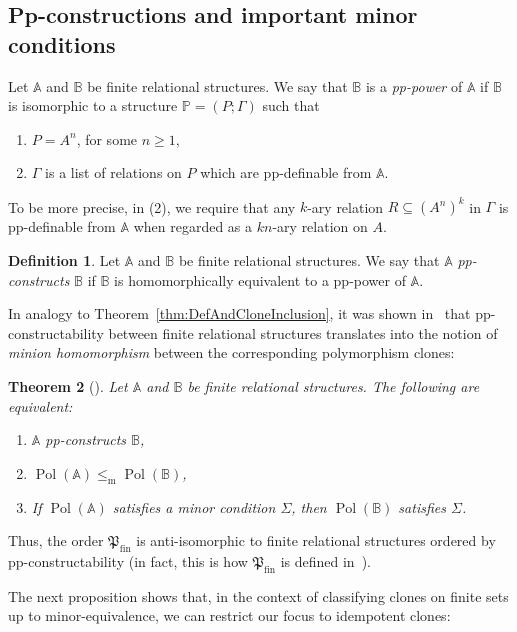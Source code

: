 \documentclass[12pt]{amsart}
\newtheorem{theorem}{Theorem}[section]
\theoremstyle{definition}
\theoremstyle{definition}
\newtheorem{definition}[theorem]{Definition}
\newcommand{\Pfin}{\mathfrak P_{\mathrm{fin}}}
\newcommand{\struct}[1]{\mathbb{#1}}
\DeclareMathOperator{\Pol}{Pol}
\newcommand{\isaminorof}{\leq_{\mathrm{m}}}
\begin{document}
\subsection{Pp-constructions and important minor conditions}
Let $\struct{A}$ and $\struct{B}$ be finite relational structures. We say that $\struct{B}$ is a \emph{pp-power} of $\struct{A}$ if $\struct{B}$ is isomorphic to a structure $\struct{P}=(P;\Gamma)$ such that
\begin{enumerate}
    \item $P=A^n$, for some $n\geq 1$,
    \item $\Gamma$ is a list of relations on $P$ which are pp-definable from $\struct{A}$.
\end{enumerate}
To be more precise, in (2), we require that any $k$-ary relation $R\subseteq (A^n)^k$ in $\Gamma$ is pp-definable from $\struct{A}$ when regarded as a $kn$-ary relation on $A$.

\begin{definition}
Let $\struct{A}$ and $\struct{B}$ be finite relational structures. We say that $\struct{A}$ \emph{pp-constructs} $\struct{B}$ if $\struct{B}$ is homomorphically equivalent to a pp-power of $\struct{A}$.
\end{definition}
In analogy to Theorem~\ref{thm:DefAndCloneInclusion}, it was shown in~\cite{wonderland} that pp-constructability between finite relational structures translates into the notion of \emph{minion homomorphism} between the corresponding polymorphism clones:

\begin{theorem}[\cite{wonderland}]\label{thm:minhomAndPPConAreTheSameThing} Let $\struct{A}$ and $\struct{B}$ be finite relational structures. The following are equivalent:
\begin{enumerate}
     \item $\struct{A}$ pp-constructs $\struct{B}$,
    \item $\Pol(\struct{A})\isaminorof\Pol(\struct{B})$,
    \item If $\Pol(\struct{A})$ satisfies a minor condition $\Sigma$, then $\Pol(\struct{B})$ satisfies $\Sigma$.
\end{enumerate}
\end{theorem}

Thus, the order $\Pfin$ is anti-isomorphic to finite relational structures ordered by pp-constructability (in fact, this is how $\Pfin$ is defined in~\cite{albert}).

The next proposition shows that, in the context of classifying clones on finite sets up to minor-equivalence, we can restrict our focus to idempotent clones:
\end{document}
